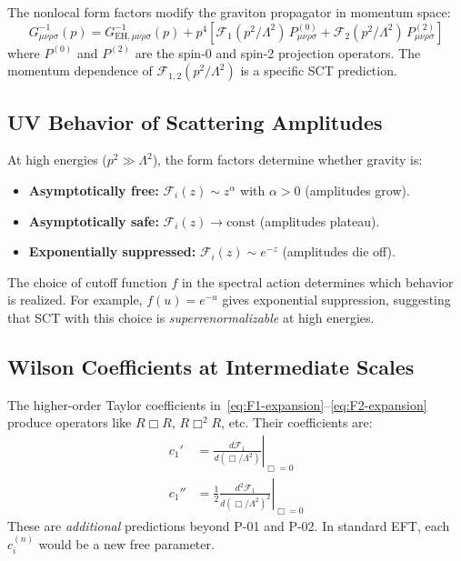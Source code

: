 \documentclass[11pt,a4paper]{article}
\begin{document}
The nonlocal form factors modify the graviton propagator in momentum space:
\begin{equation}
  G^{-1}_{\mu\nu\rho\sigma}(p) = G^{-1}_{\text{EH},\mu\nu\rho\sigma}(p)
    + p^4\left[
      \mathcal{F}_1(p^2/\Lambda^2)\,P^{(0)}_{\mu\nu\rho\sigma}
      + \mathcal{F}_2(p^2/\Lambda^2)\,P^{(2)}_{\mu\nu\rho\sigma}
    \right]
    \label{eq:modified-propagator}
\end{equation}
where $P^{(0)}$ and $P^{(2)}$ are the spin-0 and spin-2 projection operators. The momentum dependence of $\mathcal{F}_{1,2}(p^2/\Lambda^2)$ is a specific SCT prediction.

\subsection{UV Behavior of Scattering Amplitudes}

At high energies ($p^2 \gg \Lambda^2$), the form factors determine whether gravity is:
\begin{itemize}
  \item \textbf{Asymptotically free:} $\mathcal{F}_i(z) \sim z^\alpha$ with $\alpha > 0$ (amplitudes grow).
  \item \textbf{Asymptotically safe:} $\mathcal{F}_i(z) \to \text{const}$ (amplitudes plateau).
  \item \textbf{Exponentially suppressed:} $\mathcal{F}_i(z) \sim e^{-z}$ (amplitudes die off).
\end{itemize}
The choice of cutoff function $f$ in the spectral action determines which behavior is realized. For example, $f(u) = e^{-u}$ gives exponential suppression, suggesting that SCT with this choice is \emph{superrenormalizable} at high energies.

\subsection{Wilson Coefficients at Intermediate Scales}

The higher-order Taylor coefficients in~\eqref{eq:F1-expansion}--\eqref{eq:F2-expansion} produce operators like $R\Box R$, $R\Box^2 R$, etc. Their coefficients are:
\begin{align}
  c_1' &= \left.\frac{d\mathcal{F}_1}{d(\Box/\Lambda^2)}\right|_{\Box=0} \label{eq:c1-prime}\\
  c_1'' &= \frac{1}{2}\left.\frac{d^2\mathcal{F}_1}{d(\Box/\Lambda^2)^2}\right|_{\Box=0} \label{eq:c1-double-prime}
\end{align}
These are \emph{additional} predictions beyond P-01 and P-02. In standard EFT, each $c_i^{(n)}$ would be a new free parameter.
\end{document}

